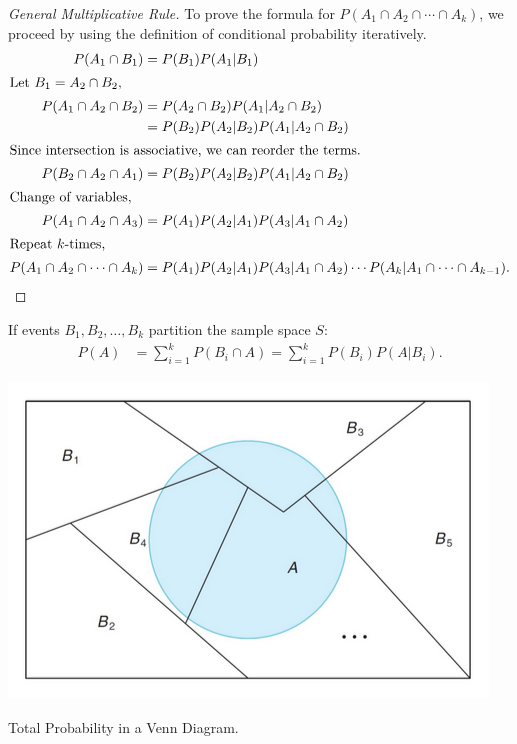 \documentclass{article}
\begin{document}
\begin{proof}[General Multiplicative Rule]
    To prove the formula for \( P(A_1 \cap A_2 \cap \cdots \cap A_k) \), we proceed by using the definition of conditional probability iteratively.
    \begin{align*}
        P(A_{1} \cap B_{1}) &= P(B_{1})P(A_{1}|B_{1}) \\
        \intertext{Let \( B_{1} = A_{2} \cap B_{2} \),}
        P(A_{1} \cap A_{2} \cap B_{2}) &= P(A_{2} \cap B_{2})P(A_{1}|A_{2} \cap B_{2}) \\
        &= P(B_{2})P(A_{2}|B_{2})P(A_{1}|A_{2} \cap B_{2}) \\
        \intertext{Since intersection is associative, we can reorder the terms.}
        P(B_{2} \cap A_{2} \cap A_{1}) &= P(B_{2})P(A_{2}|B_{2})P(A_{1}|A_{2} \cap B_{2}) \\
        \intertext{Change of variables,}
        P(A_{1} \cap A_{2} \cap A_{3}) &= P(A_{1})P(A_{2}|A_{1})P(A_{3}|A_{1} \cap A_{2}) \\
        \intertext{Repeat \( k \)-times,}
        P(A_{1} \cap A_{2} \cap \cdots \cap A_{k}) &= P(A_{1})P(A_{2}|A_{1})P(A_{3}|A_{1} \cap A_{2})\cdots P(A_{k}|A_{1} \cap \cdots \cap A_{k-1})
    .\end{align*}
\end{proof}

\begin{theorem}
If events \( B_1, B_2, \ldots, B_k \) partition the sample space \( S \):
\begin{align}
    P(A) &= \sum_{i=1}^k P(B_i \cap A) = \sum_{i=1}^k P(B_i)P(A|B_i).
\end{align}
\end{theorem}

\begin{marginfigure}
    \centering
    \includegraphics[width=\textwidth]{images/20250110_171204.png}
    \caption{Total Probability in a Venn Diagram.}
    \label{fig:total_probability}
\end{marginfigure}
\end{document}
